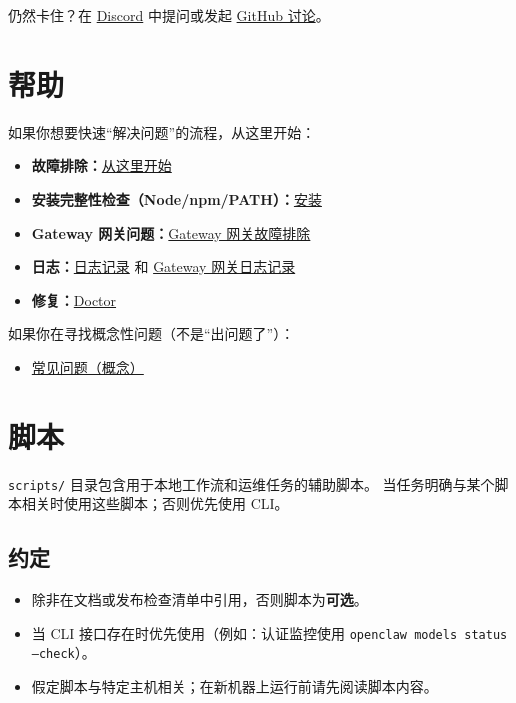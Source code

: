 \hrulefill


仍然卡住？在 \href{https://discord.com/invite/clawd}{Discord} 中提问或发起 \href{https://github.com/openclaw/openclaw/discussions}{GitHub 讨论}。


\clearpage

\section{帮助}


如果你想要快速“解决问题”的流程，从这里开始：

\begin{itemize}
  \item \textbf{故障排除：}\href{/help/troubleshooting}{从这里开始}
  \item \textbf{安装完整性检查（Node/npm/PATH）：}\href{/install\#nodejs--npm-path-sanity}{安装}
  \item \textbf{Gateway 网关问题：}\href{/gateway/troubleshooting}{Gateway 网关故障排除}
  \item \textbf{日志：}\href{/logging}{日志记录} 和 \href{/gateway/logging}{Gateway 网关日志记录}
  \item \textbf{修复：}\href{/gateway/doctor}{Doctor}
\end{itemize}


如果你在寻找概念性问题（不是“出问题了”）：

\begin{itemize}
  \item \href{/help/faq}{常见问题（概念）}
\end{itemize}



\clearpage

\section{脚本}


\texttt{scripts/} 目录包含用于本地工作流和运维任务的辅助脚本。
当任务明确与某个脚本相关时使用这些脚本；否则优先使用 CLI。

\subsection{约定}


\begin{itemize}
  \item 除非在文档或发布检查清单中引用，否则脚本为\textbf{可选}。
  \item 当 CLI 接口存在时优先使用（例如：认证监控使用 \texttt{openclaw models status --check}）。
  \item 假定脚本与特定主机相关；在新机器上运行前请先阅读脚本内容。
\end{itemize}


